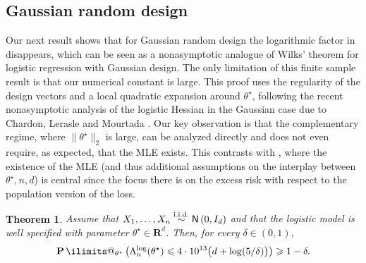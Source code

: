 \documentclass[11pt, letterpaper, hidelinks]{article}
\makeatletter
\newcommand{\R}{\mathbf R}
\newcommand{\1}{\mathbf 1}
\renewcommand{\le}{\leqslant}
\renewcommand{\ge}{\geqslant}
\newcommand{\iid}{\textnormal{i.i.d.}}
\newcommand{\simiid}{\stackrel{\iid}{\sim}}
\renewcommand{\P}{\operatorname*{\mathbf{P}}\ilimits@}
\theoremstyle{plain}
\newtheorem{theorem}{Theorem}[section]
\theoremstyle{definition}
\newcommand{\thetastar}{\theta^\star}
\newcommand{\Normal}[2]{\mathsf{N}\left(#1, #2\right)}
\makeatother
\begin{document}
\subsection{Gaussian random design}

Our next result shows that for Gaussian random design the logarithmic factor in
 disappears, which can be seen as a nonasymptotic analogue of Wilks' theorem for logistic regression with Gaussian design.
The only limitation of this finite sample result is that our numerical constant is large. This proof uses the regularity of the design vectors and a local quadratic expansion around $\thetastar$, following the recent nonasymptotic analysis of the logistic Hessian in the Gaussian case due to Chardon, Lerasle and Mourtada \cite{chardon2024logistic}. Our key observation is that the complementary regime, where $\|\thetastar\|_2$ is large, can be analyzed directly and does not even require, as expected, that the MLE exists. This contrasts with \cite{chardon2024logistic}, where the existence of the MLE (and thus additional assumptions on the interplay between $\thetastar, n, d$) is central since the focus there is on the excess risk with respect to the population version of the loss.

\begin{theorem}
\label{thm:gaussian-design-logfree}
Assume that $X_1,\dots,X_n \simiid \Normal{0}{I_d}$ and that the logistic model is
well specified with parameter $\thetastar \in \R^d$. Then, for every $\delta \in (0,1)$,
\[
\P_{\thetastar}\left(
\Lambda_n^{\operatorname{log}}(\thetastar)
\le
4\cdot 10^{13}\bigl(d+\log(5/\delta)\bigr)
\right)
\ge
1-\delta.
\]
\end{theorem}
\end{document}
